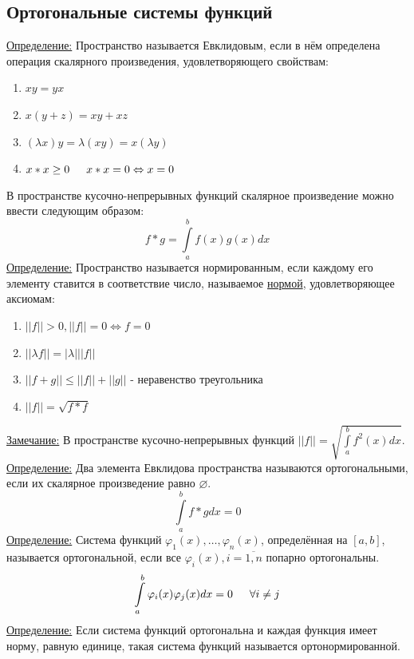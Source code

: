 \documentclass[12pt]{article}
\let\oldint\int
\renewcommand{\int}{\oldint\limits}
\begin{document}
    \subsection{Ортогональные системы функций}
    \underline{Определение:} Пространство называется Евклидовым, если в нём определена операция скалярного произведения, удовлетворяющего свойствам:
    \begin{enumerate}
      \item $xy = yx$
      \item $x(y+z) = xy + xz$
      \item $(\lambda x)y = \lambda (xy) = x (\lambda y)$
      \item $x * x \geq 0 \indent x * x = 0 \Leftrightarrow x = 0$
    \end{enumerate}
    В пространстве кусочно-непрерывных функций скалярное произведение можно ввести следующим образом:
    \[ f * g = \int_{a}^{b} f(x) g(x) dx \]
    \underline{Определение:} Пространство называется нормированным, если каждому его элементу ставится в соответствие число, называемое \underline{нормой}, удовлетворяющее аксиомам:
    \begin{enumerate}
      \item $||f|| > 0, ||f|| = 0 \Leftrightarrow f = 0$
      \item $|| \lambda f|| = |\lambda| ||f||$
      \item $||f + g|| \leq ||f|| + ||g||$ - неравенство треугольника
      \item $||f|| = \sqrt{f * f}$
    \end{enumerate}
    \underline{Замечание:} В пространстве кусочно-непрерывных функций $||f|| = \sqrt{\int_{a}^{b} f^2(x)dx}$.
    \underline{Определение:} Два элемента Евклидова пространства называются ортогональными, если их скалярное произведение равно $\varnothing$.
    \[ \int_{a}^{b} f * g dx = 0 \]
    \underline{Определение:} Система функций $\varphi_1(x), \dots, \varphi_n(x)$, определённая на $[a, b]$, называется ортогональной, если все $\varphi_i(x), i = \overline{1,n}$ попарно ортогональны.
    \[ \int_{a}^{b} \varphi_i(x) \varphi_j(x) dx = 0 \indent \forall i \neq j \]
    \underline{Определение:} Если система функций ортогональна и каждая функция имеет норму, равную единице, такая система функций называется ортонормированной.
  
\end{document}
